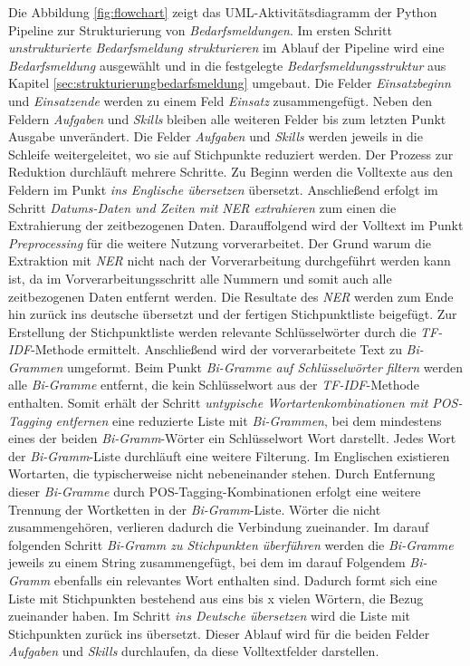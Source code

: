 Die Abbildung \ref{fig:flowchart} zeigt das UML-Aktivitätsdiagramm der Python Pipeline zur Strukturierung von \emph{Bedarfsmeldungen}. Im ersten Schritt \emph{unstrukturierte Bedarfsmeldung strukturieren} im Ablauf der Pipeline wird eine \emph{Bedarfsmeldung} ausgewählt und in die festgelegte \emph{Bedarfsmeldungsstruktur} aus Kapitel \ref{sec:strukturierungbedarfsmeldung} umgebaut. Die Felder \emph{Einsatzbeginn} und \emph{Einsatzende} werden zu einem Feld \emph{Einsatz} zusammengefügt. Neben den Feldern \emph{Aufgaben} und \emph{Skills} bleiben alle weiteren Felder bis zum letzten Punkt Ausgabe unverändert. Die Felder \emph{Aufgaben} und \emph{Skills} werden jeweils in die Schleife weitergeleitet, wo sie auf Stichpunkte reduziert werden. Der Prozess zur Reduktion durchläuft mehrere Schritte. Zu Beginn werden die Volltexte aus den Feldern im Punkt \emph{ins Englische übersetzen} übersetzt. Anschließend erfolgt im Schritt \emph{Datums-Daten und Zeiten mit NER extrahieren} zum einen die Extrahierung der zeitbezogenen Daten. Darauffolgend wird der Volltext im Punkt \emph{Preprocessing} für die weitere Nutzung vorverarbeitet. Der Grund warum die Extraktion mit \emph{NER} nicht nach der Vorverarbeitung durchgeführt werden kann ist, da im Vorverarbeitungsschritt alle Nummern und somit auch alle zeitbezogenen Daten entfernt werden. Die Resultate des \emph{NER} werden zum Ende hin zurück ins deutsche übersetzt und der fertigen Stichpunktliste beigefügt. Zur Erstellung der Stichpunktliste werden relevante Schlüsselwörter durch die \emph{TF-IDF}-Methode ermittelt. Anschließend wird der vorverarbeitete Text zu \emph{Bi-Grammen} umgeformt. Beim Punkt \emph{Bi-Gramme auf Schlüsselwörter filtern} werden alle \emph{Bi-Gramme} entfernt, die kein Schlüsselwort aus der \emph{TF-IDF}-Methode enthalten. Somit erhält der Schritt \emph{untypische Wortartenkombinationen mit POS-Tagging entfernen} eine reduzierte Liste mit \emph{Bi-Grammen}, bei dem mindestens eines der beiden \emph{Bi-Gramm}-Wörter ein Schlüsselwort Wort darstellt. Jedes Wort der \emph{Bi-Gramm}-Liste durchläuft eine weitere Filterung. Im Englischen existieren Wortarten, die typischerweise nicht nebeneinander stehen. Durch Entfernung dieser \emph{Bi-Gramme} durch POS-Tagging-Kombinationen erfolgt eine weitere Trennung der Wortketten in der \emph{Bi-Gramm}-Liste. Wörter die nicht zusammengehören, verlieren dadurch die Verbindung zueinander. Im darauf folgenden Schritt \emph{Bi-Gramm zu Stichpunkten überführen} werden die \emph{Bi-Gramme} jeweils zu einem String zusammengefügt, bei dem im darauf Folgendem \emph{Bi-Gramm} ebenfalls ein relevantes Wort enthalten sind. Dadurch formt sich eine Liste mit Stichpunkten bestehend aus eins bis x vielen Wörtern, die Bezug zueinander haben. Im Schritt \emph{ins Deutsche übersetzen} wird die Liste mit Stichpunkten zurück ins übersetzt. Dieser Ablauf wird für die beiden Felder \emph{Aufgaben} und \emph{Skills} durchlaufen, da diese Volltextfelder darstellen.
